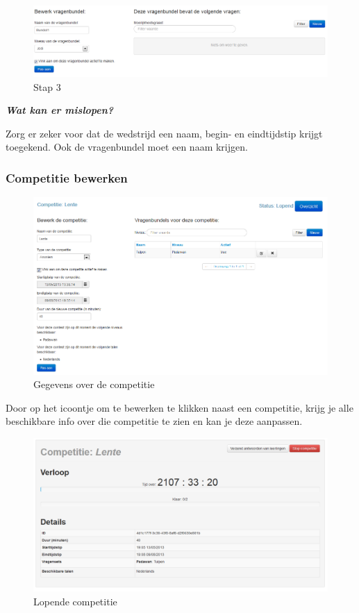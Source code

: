 \documentclass[]{article}
\begin{document}
\begin{figure}[!ht]
	\centering
	\includegraphics[width=1\textwidth]{img/stap3}
	\caption{Stap 3}
	\label{stap3}
\end{figure}

\textbf{\textit{Wat kan er mislopen?}}

Zorg er zeker voor dat de wedstrijd een naam, begin- en eindtijdstip krijgt toegekend. Ook de vragenbundel moet een naam krijgen.

\subsubsection{Competitie bewerken}

\begin{figure}[!ht]
	\centering
	\includegraphics[width=1\textwidth]{img/compinfo}
	\caption{Gegevens over de competitie}
	\label{compinfo}
\end{figure}

Door op het icoontje om te bewerken te klikken naast een competitie, krijg je alle beschikbare info over die competitie te zien en kan je deze aanpassen.

\begin{figure}[!ht]
	\centering
	\includegraphics[width=1\textwidth]{img/comprun}
	\caption{Lopende competitie}
	\label{comprun}
\end{figure}
\end{document}
